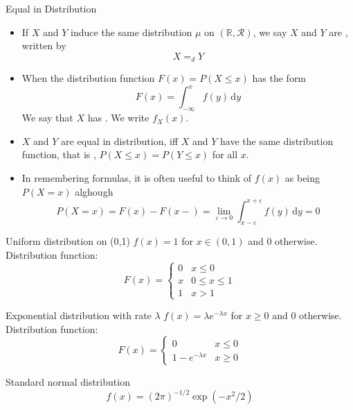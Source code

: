 \documentclass[../main.tex]{subfiles}
\begin{document}
\begin{definition}{Equal in Distribution}{}
   \begin{itemize}
    \item  If \(  X  \) and \(  Y  \) induce the same distribution \(  \mu   \) on \(  \left( \mathbb{R} ,\mathcal{R} \right)   \), we say \(  X  \) and \(  Y  \) are , written by \[
    X = _{d} Y
    \]    
    \item When the distribution function \(  F\left( x \right)= P\left( X\le x \right)    \)  has the form \[
    F\left( x \right)= \int_{-\infty}^{x}f\left( y \right)\,\mathrm{d} y  
    \]We say that \(  X  \) has .  We write \(  f_{X}\left( x \right)   \).  
   \end{itemize}
   
\end{definition}
\begin{remark}
   \begin{itemize}
    \item   \(  X  \) and \(  Y  \) are equal in distribution, iff \(  X  \) and \(  Y  \) have the same distribution function, that is , \(  P\left( X\le x \right)= P\left( Y\le x \right)    \) for all \(  x  \).      
    \item In remembering formulas, it is often useful to think of \(  f\left( x \right)   \) as being \(  P\left( X= x \right)   \) alghough \[
    P\left( X= x \right)= F\left( x \right)-F\left( x- \right)= \lim_{ \varepsilon \to 0}\int_{x- \varepsilon }^{x+  \varepsilon }f\left( y \right)\,\mathrm{d} y= 0   
    \]  
   \end{itemize}
   
      
\end{remark}
\begin{example}{Uniform distribution on (0,1)}{}
$f(x) = 1$ for $x \in (0, 1)$ and 0 otherwise. Distribution function:
\[
F(x) = \begin{cases} 
0 & x \le 0 \\
x & 0 \le x \le 1 \\
1 & x > 1 
\end{cases}
\]
\end{example}
 \begin{example}{Exponential distribution with rate $\lambda$}{}
$f(x) = \lambda e^{-\lambda x}$ for $x \geq 0$ and $0$ otherwise. Distribution function:
\[
F(x) = \begin{cases}
    0 & x \leq 0 \\
    1 - e^{- \lambda x} & x \geq 0
\end{cases}
\]
\end{example}
\begin{example}{Standard normal distribution}{}
\[
f(x) = (2\pi)^{-1/2} \exp(-x^2/2)
\]
\end{example}
\end{document}
